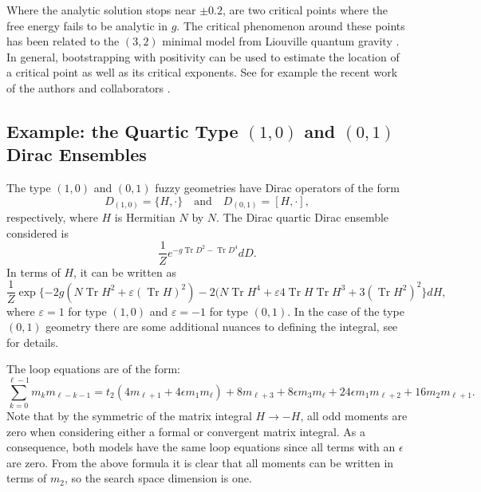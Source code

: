 \documentclass[11pt]{article}
\theoremstyle{plain}
\DeclareMathOperator{\tr}{Tr}
\begin{document}
Where the analytic solution stops near $\pm 0.2$, are two critical points where the free energy fails to be analytic in $g$. The critical phenomenon around these points has been related to the $(3,2)$ minimal model from Liouville quantum gravity \cite{hessam2023double}. In general, bootstrapping with positivity can be used to estimate the location of a critical point as well as its critical exponents. See for example the recent work of the authors and collaborators \cite{bootstraps critical behaviour}.  



\subsection{Example: the Quartic Type $(1,0)$ and $(0,1)$ Dirac Ensembles}	
  The type $(1,0)$ and $(0,1)$ fuzzy geometries have Dirac operators of the form 
$$D_{(1,0)} = \{H,\cdot\}  \quad \text{and}\quad D_{(0,1)} = [H,\cdot],$$
respectively, where $H$ is Hermitian $N$ by $N$. The Dirac quartic Dirac ensemble considered is
\begin{equation*}
	\frac{1}{Z} e^{-g\tr D^2 -\tr D^4}dD.
\end{equation*}
In terms of $H$, it can be written as 
\begin{equation} \label{action}
	\frac{1}{Z} \exp\{-2g(N\tr H^2 +\varepsilon(\tr H)^2) -2(N \tr H^{4} +\varepsilon 4 \tr H \tr H^3 + 3(\tr H^2)^2\}dH,
\end{equation}
where $\varepsilon =1$ for type $(1,0)$ and $\varepsilon =-1$ for type $(0,1)$. In the case of the type $(0,1)$ geometry there are some additional nuances to defining the integral, see \cite{Khalkhali2025 large N limit} for details. 

The loop equations are of the form:
\begin{equation*}
	\sum_{k=0}^{\ell-1} m_k m_{\ell-k-1}=t_{2}\left(4 m_{\ell+1}+ 4 \epsilon  m_1 m_{\ell}\right)+8m_{\ell+3}+ 8\epsilon  m_3 m_{\ell}+ 24\epsilon m_1 m_{\ell+2}+16 m_2 m_{\ell+1}.
\end{equation*}
Note that by the symmetric of the matrix integral $H \rightarrow -H$, all odd moments are zero when considering either a formal or convergent matrix integral. As a consequence, both models have the same loop equations since all terms with an $\epsilon$ are zero. From the above formula it is clear that all moments can be written in terms of $m_{2}$, so the search space dimension is one.
\end{document}
